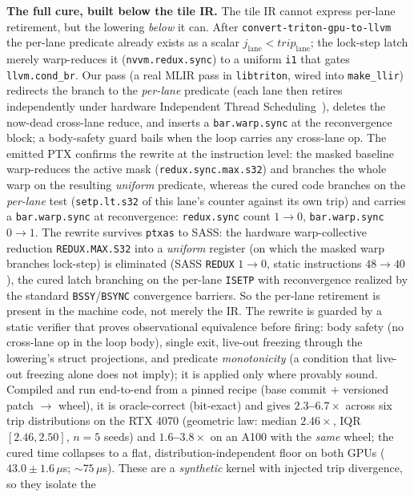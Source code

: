 \documentclass[sigplan,review,anonymous,10pt]{acmart}
\begin{document}
\textbf{The full cure, built below the tile IR.} The tile IR cannot express per-lane retirement, but the
lowering \emph{below} it can. After \texttt{convert-triton-gpu-to-llvm} the per-lane predicate already
exists as a scalar $j_{\mathrm{lane}}<\mathit{trip}_{\mathrm{lane}}$; the lock-step latch merely
warp-reduces it (\texttt{nvvm.redux.sync}) to a uniform \texttt{i1} that gates \texttt{llvm.cond\_br}. Our
pass (a real MLIR pass in \texttt{libtriton}, wired into \texttt{make\_llir}) redirects the branch to the
\emph{per-lane} predicate (each lane then retires independently under hardware Independent Thread Scheduling~\cite{its2017}), deletes the now-dead cross-lane reduce, and inserts a \texttt{bar.warp.sync} at the
reconvergence block; a body-safety guard bails when the loop carries any cross-lane op. The emitted PTX confirms the rewrite at the instruction level: the masked baseline warp-reduces the active mask (\texttt{redux.sync.max.s32}) and branches the whole warp on the resulting \emph{uniform} predicate, whereas the cured code branches on the \emph{per-lane} test (\texttt{setp.lt.s32} of this lane's counter against its own trip) and carries a \texttt{bar.warp.sync} at reconvergence: \texttt{redux.sync} count $1\!\rightarrow\!0$, \texttt{bar.warp.sync} $0\!\rightarrow\!1$. The rewrite survives \texttt{ptxas} to SASS: the hardware warp-collective reduction \texttt{REDUX.MAX.S32} into a \emph{uniform} register (on which the masked warp branches lock-step) is eliminated (SASS \texttt{REDUX} $1\!\rightarrow\!0$, static instructions $48\!\rightarrow\!40$), the cured latch branching on the per-lane \texttt{ISETP} with reconvergence realized by the standard \texttt{BSSY}/\texttt{BSYNC} convergence barriers. So the per-lane retirement is present in the machine code, not merely the IR. The rewrite is guarded by a static verifier that proves observational equivalence before firing: body safety (no cross-lane op in the loop body), single exit, live-out freezing through the lowering's struct projections, and predicate \emph{monotonicity} (a condition that live-out freezing alone does not imply); it is applied only where provably sound. Compiled and run
end-to-end from a pinned recipe (base commit $+$ versioned patch $\rightarrow$ wheel), it is
oracle-correct (bit-exact) and gives \textbf{$2.3$--$6.7\times$} across six trip distributions on the
RTX 4070 (geometric law: median $2.46\times$, IQR $[2.46,2.50]$, $n{=}5$ seeds) and
\textbf{$1.6$--$3.8\times$} on an A100 with the \emph{same} wheel; the cured time collapses to a flat,
distribution-independent floor on both GPUs ($43.0\pm1.6\,\mu$s; ${\sim}75\,\mu$s). These are a \emph{synthetic} kernel with injected trip divergence, so they isolate the
\end{document}

